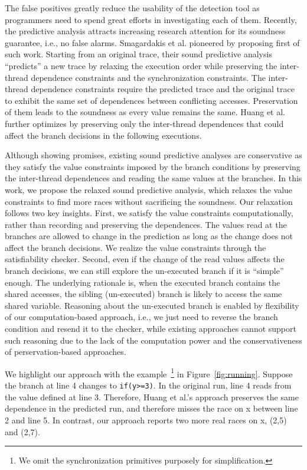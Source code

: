 The false positives greatly reduce the usability of the detection tool as programmers need to spend great efforts  in investigating each of them. 
Recently, the predictive analysis attracts increasing research attention for its soundness guarantee, i.e., no false alarms. Smagardakis et al. pioneered by proposing first of such work. Starting from an original trace, their sound predictive analysis ``predicts'' a new trace by relaxing the execution order 
 while preserving the inter-thread dependence constraints and the synchronization constraints.  The inter-thread dependence constraints require the predicted trace and the original trace to exhibit the same set of dependences between conflicting accesses. Preservation of them leads to the soundness 
 as every value remains the same. Huang et al.~\cite{} further optimizes by preserving only the inter-thread dependences that could affect the branch decisions in the following executions.  
 
Although showing promises,  existing sound predictive analyses  are conservative as they satisfy the value constraints imposed by the branch conditions by preserving the inter-thread dependences and reading the same values at the branches. In this work, we propose the relaxed sound predictive analysis, which relaxes the value constraints to find more races without sacrificing the soundness. Our relaxation follows two key insights. First, we satisfy the value constraints computationally, rather than recording and preserving the dependences. The values read at the branches are allowed to change in the prediction as long as the change does not affect the branch decisions.  We realize the value constraints through  the satisfiability checker. Second, even if the change of the read values affects the branch decisions, we can still explore the un-executed branch  if it is ``simple'' enough. The underlying rationale is, when the executed branch contains the shared accesses, the sibling (un-executed) branch is likely to access the same shared variable. Reasoning about the un-executed branch is enabled by flexibility of  our computation-based approach, i.e., we just need to reverse the branch condition and resend it to the checker, while existing approaches cannot support such reasoning due to the lack of the computation power and the conservativeness of perservation-based approaches. 


We highlight our approach with the example~\footnote{We omit the synchronization primitives purposely for simplification.} in Figure~\ref{fig:running}. Suppose the branch at line 4 changes to {\tt if(y>=3)}. In the original run, line 4 reads from the value defined at line 3. Therefore, Huang et al.'s approach preserves the same dependence in the predicted run, and therefore misses the race on x between line 2 and line 5. In contrast, our approach reports two more real races on x, (2,5) and (2,7). 

